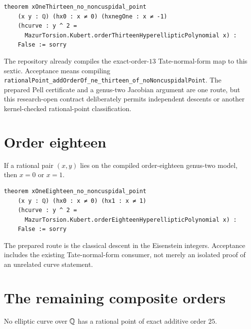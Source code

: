 \begin{verbatim}
theorem xOneThirteen_no_noncuspidal_point
    (x y : ℚ) (hx0 : x ≠ 0) (hxnegOne : x ≠ -1)
    (hcurve : y ^ 2 =
      MazurTorsion.Kubert.orderThirteenHyperellipticPolynomial x) :
    False := sorry
\end{verbatim}

The repository already compiles the exact-order-\(13\) Tate-normal-form map
to this sextic.  Acceptance means compiling
\texttt{rationalPoint\_addOrderOf\_ne\_thirteen\_of\_noNoncuspidalPoint}.
The prepared Pell certificate and a genus-two Jacobian argument are one
route, but this research-open contract deliberately permits independent descents or
another kernel-checked rational-point classification.

\section{Order eighteen}

\begin{theorem}\label{node:MT-X18-NONCUSP}
If a rational pair \((x,y)\) lies on the compiled order-eighteen genus-two
model, then \(x=0\) or \(x=1\).
\leanpending
\end{theorem}

\begin{verbatim}
theorem xOneEighteen_no_noncuspidal_point
    (x y : ℚ) (hx0 : x ≠ 0) (hx1 : x ≠ 1)
    (hcurve : y ^ 2 =
      MazurTorsion.Kubert.orderEighteenHyperellipticPolynomial x) :
    False := sorry
\end{verbatim}

The prepared route is the classical descent in the Eisenstein integers.
Acceptance includes the existing Tate-normal-form consumer, not merely an
isolated proof of an unrelated curve statement.

\section{The remaining composite orders}

\begin{theorem}\label{node:MT-O25-EXCLUDE}
No elliptic curve over \(\mathbb{Q}\) has a rational point of exact additive order
\(25\).
\leanpending
\end{theorem}

